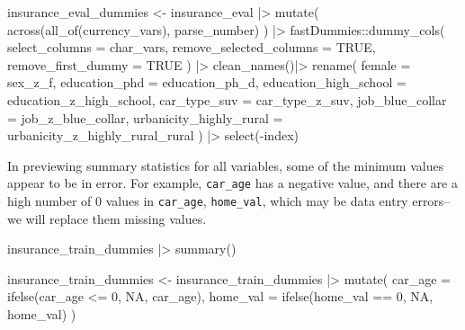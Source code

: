 \documentclass[
  11pt]{article}
\newenvironment{Shaded}{\begin{snugshade}}{\end{snugshade}}
\newcommand{\AttributeTok}[1]{\textcolor[rgb]{0.40,0.45,0.13}{#1}}
\newcommand{\ConstantTok}[1]{\textcolor[rgb]{0.56,0.35,0.01}{#1}}
\newcommand{\DecValTok}[1]{\textcolor[rgb]{0.68,0.00,0.00}{#1}}
\newcommand{\FunctionTok}[1]{\textcolor[rgb]{0.28,0.35,0.67}{#1}}
\newcommand{\NormalTok}[1]{\textcolor[rgb]{0.00,0.23,0.31}{#1}}
\newcommand{\OtherTok}[1]{\textcolor[rgb]{0.00,0.23,0.31}{#1}}
\newcommand{\SpecialCharTok}[1]{\textcolor[rgb]{0.37,0.37,0.37}{#1}}
\begin{document}
\begin{Shaded}
\begin{Highlighting}[]
\NormalTok{insurance\_eval\_dummies }\OtherTok{\textless{}{-}}\NormalTok{ insurance\_eval }\SpecialCharTok{|\textgreater{}}
    \FunctionTok{mutate}\NormalTok{(}
        \FunctionTok{across}\NormalTok{(}\FunctionTok{all\_of}\NormalTok{(currency\_vars), parse\_number)}
\NormalTok{    ) }\SpecialCharTok{|\textgreater{}}
\NormalTok{    fastDummies}\SpecialCharTok{::}\FunctionTok{dummy\_cols}\NormalTok{(}
        \AttributeTok{select\_columns =}\NormalTok{ char\_vars,}
        \AttributeTok{remove\_selected\_columns =} \ConstantTok{TRUE}\NormalTok{,}
        \AttributeTok{remove\_first\_dummy =} \ConstantTok{TRUE}
\NormalTok{    ) }\SpecialCharTok{|\textgreater{}} 
    \FunctionTok{clean\_names}\NormalTok{()}\SpecialCharTok{|\textgreater{}} 
    \FunctionTok{rename}\NormalTok{(}
        \AttributeTok{female =}\NormalTok{ sex\_z\_f,}
        \AttributeTok{education\_phd =}\NormalTok{ education\_ph\_d,}
        \AttributeTok{education\_high\_school =}\NormalTok{ education\_z\_high\_school,}
        \AttributeTok{car\_type\_suv =}\NormalTok{ car\_type\_z\_suv,}
        \AttributeTok{job\_blue\_collar =}\NormalTok{ job\_z\_blue\_collar,}
        \AttributeTok{urbanicity\_highly\_rural =}\NormalTok{ urbanicity\_z\_highly\_rural\_rural}
\NormalTok{    ) }\SpecialCharTok{|\textgreater{}} 
    \FunctionTok{select}\NormalTok{(}\SpecialCharTok{{-}}\NormalTok{index)}
\end{Highlighting}
\end{Shaded}

In previewing summary statistics for all variables, some of the minimum
values appear to be in error. For example, \texttt{car\_age} has a
negative value, and there are a high number of 0 values in
\texttt{car\_age}, \texttt{home\_val}, which may be data entry
errors--we will replace them missing values.

\begin{Shaded}
\begin{Highlighting}[]
\NormalTok{insurance\_train\_dummies }\SpecialCharTok{|\textgreater{}} \FunctionTok{summary}\NormalTok{()}

\NormalTok{insurance\_train\_dummies }\OtherTok{\textless{}{-}}\NormalTok{ insurance\_train\_dummies }\SpecialCharTok{|\textgreater{}}
    \FunctionTok{mutate}\NormalTok{(}
        \AttributeTok{car\_age =} \FunctionTok{ifelse}\NormalTok{(car\_age }\SpecialCharTok{\textless{}=} \DecValTok{0}\NormalTok{, }\ConstantTok{NA}\NormalTok{, car\_age),}
        \AttributeTok{home\_val =} \FunctionTok{ifelse}\NormalTok{(home\_val }\SpecialCharTok{==} \DecValTok{0}\NormalTok{, }\ConstantTok{NA}\NormalTok{, home\_val)}
\NormalTok{    )}
\end{Highlighting}
\end{Shaded}
\end{document}
